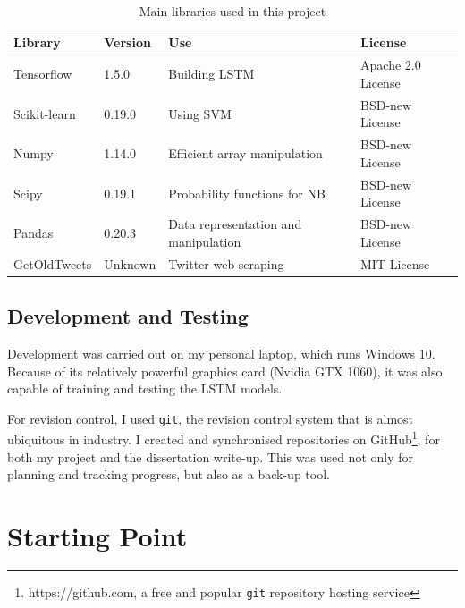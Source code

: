 \documentclass[12pt,a4paper,twoside,openright]{report}
\begin{document}
\begin{table}[H]
\centering
\begin{tabular}{llll}
\toprule
\textbf{Library}                        & \textbf{Version} & \textbf{Use} & \textbf{License} \\ \midrule
Tensorflow                             & 1.5.0            & Building LSTM        & Apache 2.0 License              \\ [0.5ex]
Scikit-learn                           & 0.19.0           & Using SVM        & BSD-new License              \\ [0.5ex]
Numpy                                  & 1.14.0           & Efficient array manipulation        & BSD-new License              \\ [0.5ex]
Scipy                                  & 0.19.1           & Probability functions for NB        & BSD-new License              \\ [0.5ex]
Pandas                                 & 0.20.3           & Data representation and manipulation        & BSD-new License              \\ [0.5ex]
GetOldTweets                           & Unknown          & Twitter web scraping        & MIT License              \\ [0.5ex] \bottomrule
\end{tabular}
\caption{Main libraries used in this project}
\label{table:libs}
\end{table}

\subsection{Development and Testing}

Development was carried out on my personal laptop, which runs Windows 10. Because of its relatively 
powerful graphics card (Nvidia GTX 1060), it was also capable of training and testing the LSTM
models.

For revision control, I used \texttt{git}, the revision control system
that is almost ubiquitous in industry. I created and synchronised repositories on
GitHub\footnote{https://github.com, a free and popular \texttt{git} repository hosting service}, 
for both my project and the dissertation write-up. This was used not only for
planning and tracking progress, but also as a back-up tool. 


\section{Starting Point}
\label{sec:introStart}
\end{document}

